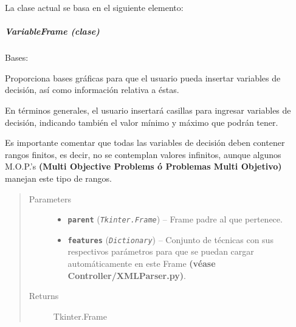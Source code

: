 \documentclass[letterpaper,10pt,english]{sphinxmanual}
\begin{document}
La clase actual se basa en el siguiente elemento:


\subparagraph{VariableFrame (clase)}
\label{View/Main/DecisionVariable/VariableFrame:module-View.Main.DecisionVariable.VariableFrame}\label{View/Main/DecisionVariable/VariableFrame::doc}\label{View/Main/DecisionVariable/VariableFrame:variableframe-clase}

\begin{fulllineitems}
\label{View/Main/DecisionVariable/VariableFrame:View.Main.DecisionVariable.VariableFrame.VariableFrame}
Bases: 

\begin{DUlineblock}{0em}
\item[] Proporciona bases gráficas para que el usuario pueda insertar
variables de decisión, así como información relativa a éstas.
\item[] En términos generales, el usuario insertará casillas para ingresar variables
de decisión, indicando también el valor mínimo y máximo que podrán tener.
\item[] Es importante comentar que todas las variables de decisión deben contener
rangos finitos, es decir, no se contemplan valores infinitos, aunque algunos
M.O.P.'s \textbf{(Multi Objective Problems ó Problemas Multi Objetivo)} manejan este tipo de rangos.         
\end{DUlineblock}
\begin{quote}\begin{description}
\item[{Parameters}] \leavevmode\begin{itemize}
\item {} 
\textbf{\texttt{parent}} (\emph{\texttt{Tkinter.Frame}}) -- Frame padre al que pertenece.

\item {} 
\textbf{\texttt{features}} (\emph{\texttt{Dictionary}}) -- Conjunto de técnicas con sus respectivos parámetros para que
se puedan cargar automáticamente en este Frame \textbf{(véase
Controller/XMLParser.py)}.

\end{itemize}

\item[{Returns}] \leavevmode
Tkinter.Frame


\end{description}
\end{quote}
\end{fulllineitems}
\end{document}
